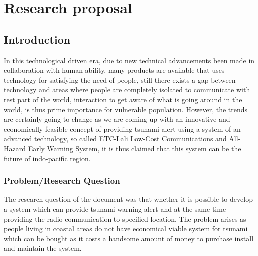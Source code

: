 
\chapter{Research proposal}\label{chapter:firstchapter} %

\label{ChapterX} %


\section{Introduction}\label{sec:firstsection}

\textbf{}
In this technological driven era, due to new technical advancements been made in collaboration with human ability, many products are available that uses technology for satisfying the need of people, still there exists a gap between technology and areas where people are completely isolated to communicate with rest part of the world, interaction to get aware of what is going around in the world, is thus prime importance for vulnerable population. However, the trends are certainly going to change as we are coming up with an innovative and economically feasible concept of providing tsunami alert using a system of an advanced technology, so called ETC-Lali Low-Cost Communications and All-Hazard Early Warning System, it is thus claimed that this system can be the future of indo-pacific region.\\

\subsection{Problem/Research Question  }
The research question of the document was that whether it is possible to develop a system which can provide tsunami warning alert and at the same time providing the radio communication to specified location. The problem arises as people living in coastal areas do not have economical viable system for tsunami which can be  bought as it costs a handsome amount of money to purchase install and maintain the system.\\

